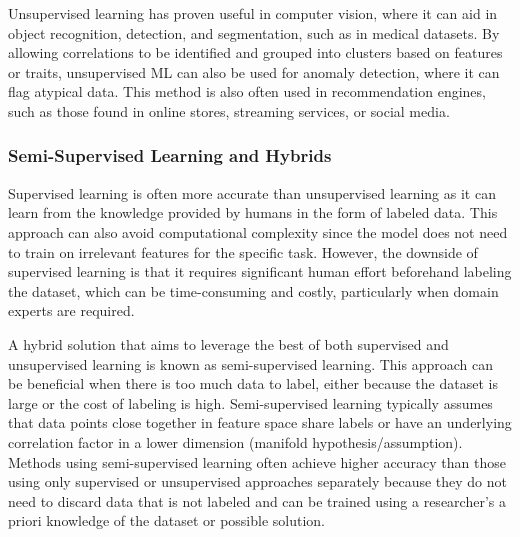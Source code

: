         Unsupervised learning has proven useful in computer vision, where it can aid in object recognition, detection, and segmentation, such as in medical datasets. By allowing correlations to be identified and grouped into clusters based on features or traits, unsupervised ML can also be used for anomaly detection, where it can flag atypical data. This method is also often used in recommendation engines, such as those found in online stores, streaming services, or social media.


        \subsubsection{Semi-Supervised Learning and Hybrids}


        Supervised learning is often more accurate than unsupervised learning as it can learn from the knowledge provided by humans in the form of labeled data. This approach can also avoid computational complexity since the model does not need to train on irrelevant features for the specific task. However, the downside of supervised learning is that it requires significant human effort beforehand labeling the dataset, which can be time-consuming and costly, particularly when domain experts are required.

        A hybrid solution that aims to leverage the best of both supervised and unsupervised learning is known as semi-supervised learning. This approach can be beneficial when there is too much data to label, either because the dataset is large or the cost of labeling is high. Semi-supervised learning typically assumes that data points close together in feature space share labels or have an underlying correlation factor in a lower dimension (manifold hypothesis/assumption). Methods using semi-supervised learning often achieve higher accuracy than those using only supervised or unsupervised approaches separately because they do not need to discard data that is not labeled and can be trained using a researcher's a priori knowledge of the dataset or possible solution.
        
